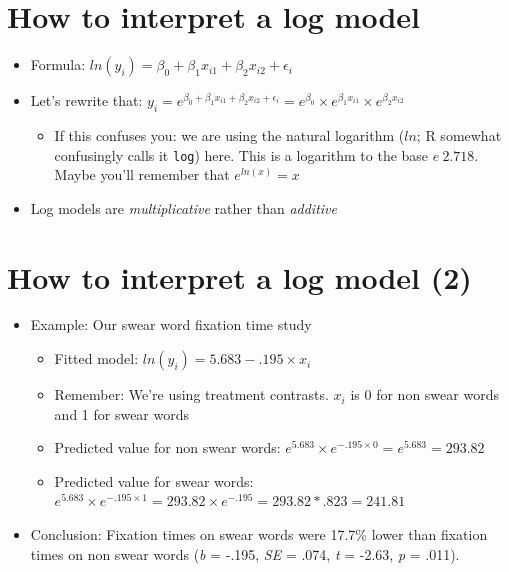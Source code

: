 \documentclass[]{article}
\begin{document}
\section{How to interpret a log
model}\label{how-to-interpret-a-log-model}

\begin{itemize}
\itemsep1pt\parskip0pt
\item
  Formula:
  $ln(y_{i}) = \beta_0 + \beta_1 x_{i1} + \beta_2 x_{i2} + \epsilon_i$
\item
  Let's rewrite that:
  $y_{i} = e^{\beta_0 + \beta_1 x_{i1} + \beta_2 x_{i2} + \epsilon_i} = e^{\beta_0} \times e^{\beta_1x_{i1}} \times e^{\beta_2x_{i2}}$

  \begin{itemize}
  \itemsep1pt\parskip0pt
  \item
    If this confuses you: we are using the natural logarithm ($ln$; R
    somewhat confusingly calls it \texttt{log}) here. This is a
    logarithm to the base $e ~ 2.718$. Maybe you'll remember that
    $e^{ln(x)} = x$
  \end{itemize}
\item
  Log models are \emph{multiplicative} rather than \emph{additive}
\end{itemize}

\section{How to interpret a log model
(2)}\label{how-to-interpret-a-log-model-2}

\begin{itemize}
\itemsep1pt\parskip0pt
\item
  Example: Our swear word fixation time study

  \begin{itemize}
  \itemsep1pt\parskip0pt
  \item
    Fitted model: $ln(y_{i}) = 5.683 - .195 \times x_i$
  \item
    Remember: We're using treatment contrasts. $x_i$ is 0 for non swear
    words and 1 for swear words
  \item
    Predicted value for non swear words:
    $e^{5.683} \times e^{-.195 \times 0} = e^{5.683} =  293.82$
  \item
    Predicted value for swear words:
    $e^{5.683} \times e^{-.195 \times 1} = 293.82 \times e^{-.195} = 293.82 * .823 = 241.81$
  \end{itemize}
\item
  Conclusion: Fixation times on swear words were 17.7\% lower than
  fixation times on non swear words (\emph{b} = -.195, \emph{SE} = .074,
  \emph{t} = -2.63, \emph{p} = .011).
\end{itemize}
\end{document}
